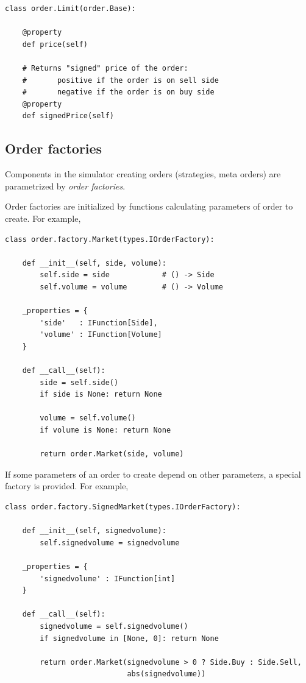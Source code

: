\documentclass[a4paper,11pt]{article}
\begin{document}
\begin{verbatim}
class order.Limit(order.Base):

    @property
    def price(self)

    # Returns "signed" price of the order:
    #       positive if the order is on sell side
    #       negative if the order is on buy side
    @property
    def signedPrice(self)
\end{verbatim}

\subsection{Order factories}\label{order-factories}

Components in the simulator creating orders (strategies, meta orders)
are parametrized by \emph{order factories}.

Order factories are initialized by functions calculating parameters of
order to create. For example,

\begin{verbatim}
class order.factory.Market(types.IOrderFactory):

    def __init__(self, side, volume):
        self.side = side            # () -> Side
        self.volume = volume        # () -> Volume

    _properties = {
        'side'   : IFunction[Side],
        'volume' : IFunction[Volume]
    }

    def __call__(self):
        side = self.side()
        if side is None: return None

        volume = self.volume()
        if volume is None: return None

        return order.Market(side, volume)
\end{verbatim}

If some parameters of an order to create depend on other parameters, a
special factory is provided. For example,

\begin{verbatim}
class order.factory.SignedMarket(types.IOrderFactory):

    def __init__(self, signedvolume):
        self.signedvolume = signedvolume

    _properties = {
        'signedvolume' : IFunction[int]
    }

    def __call__(self):
        signedvolume = self.signedvolume()
        if signedvolume in [None, 0]: return None

        return order.Market(signedvolume > 0 ? Side.Buy : Side.Sell,
                            abs(signedvolume))
\end{verbatim}
\end{document}
